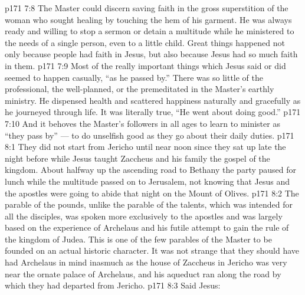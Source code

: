 \vs p171 7:8 The Master could discern saving faith in the gross superstition of the woman who sought healing by touching the hem of his garment. He was always ready and willing to stop a sermon or detain a multitude while he ministered to the needs of a single person, even to a little child. Great things happened not only because people had faith in Jesus, but also because Jesus had so much faith in them.
\vs p171 7:9 Most of the really important things which Jesus said or did seemed to happen casually, “as he passed by.” There was so little of the professional, the well\hyp{}planned, or the premeditated in the Master’s earthly ministry. He dispensed health and scattered happiness naturally and gracefully as he journeyed through life. It was literally true, “He went about doing good.”
\vs p171 7:10 And it behoves the Master’s followers in all ages to learn to minister as “they pass by” --- to do unselfish good as they go about their daily duties.
\vs p171 8:1 They did not start from Jericho until near noon since they sat up late the night before while Jesus taught Zaccheus and his family the gospel of the kingdom. About halfway up the ascending road to Bethany the party paused for lunch while the multitude passed on to Jerusalem, not knowing that Jesus and the apostles were going to abide that night on the Mount of Olives.
\vs p171 8:2 The parable of the pounds, unlike the parable of the talents, which was intended for all the disciples, was spoken more exclusively to the apostles and was largely based on the experience of Archelaus and his futile attempt to gain the rule of the kingdom of Judea. This is one of the few parables of the Master to be founded on an actual historic character. It was not strange that they should have had Archelaus in mind inasmuch as the house of Zaccheus in Jericho was very near the ornate palace of Archelaus, and his aqueduct ran along the road by which they had departed from Jericho.
\vs p171 8:3 \pc Said Jesus: 
